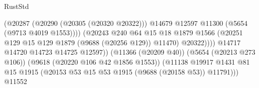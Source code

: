 \begin{lexlean}{RustStd}
\begin{coremodule}
                                                        (@20287
                                                          (@20290 (@20305 (@20320 @20322)))
                                                          @14679
                                                          @12597
                                                          @11300
                                                          (@5654 (@9713 @4019 @1553))))
                                                      (@20243
                                                        @240
                                                        @64
                                                        @15
                                                        @18
                                                        @1879
                                                        @1566
                                                        (@20251
                                                          @129
                                                          @15
                                                          @129
                                                          @1879
                                                          (@9688 (@20256 @129))
                                                          @11470)
                                                        @20322))))
                                                @14717
                                                @14720
                                                @14723
                                                @14725
                                                @12597))
                                            (@11366 (@20209 @40))
                                            (@5654 (@20213 @273 @106))
                                            (@9618 (@20220 @106 @42 @1856 @1553))
                                            (@11138
                                              @19917
                                              @1431
                                              @81
                                              @15
                                              @1915
                                              (@20153
                                                @53
                                                @15
                                                @53
                                                @1915
                                                (@9688 (@20158 @53))
                                                @11791)))
                                          @11552

\end{coremodule}
\end{lexlean}
